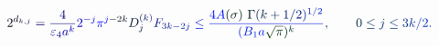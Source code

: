 \documentclass[12pt]{article}
\begin{document}
\makeatletter
\renewcommand*{\@textcolor}[3]{%
  \protect\leavevmode
  \begingroup
    \color#1{#2}#3%
  \endgroup
}
\makeatother
\begin{displaymath}
\mathcolor[RGB]{0,0,15}{2} ^ { \mathcolor[RGB]{0,0,30}{d} _ { \mathcolor[RGB]{0,0,45}{k} \mathcolor[RGB]{0,0,60}{,} \mathcolor[RGB]{0,0,75}{j} } } \mathcolor[RGB]{0,0,90}{=} \mathcolor[RGB]{0,0,105}{\frac { \mathcolor[RGB]{0,0,120}{4} } { \mathcolor[RGB]{0,0,135}{\varepsilon} _ { \mathcolor[RGB]{0,0,150}{4} } \mathcolor[RGB]{0,0,165}{a} ^ { \mathcolor[RGB]{0,0,180}{k} } } } \mathcolor[RGB]{0,0,195}{2} ^ { \mathcolor[RGB]{0,0,210}{-} \mathcolor[RGB]{0,0,225}{j} } \mathcolor[RGB]{0,0,240}{\pi} ^ { \mathcolor[RGB]{0,0,255}{j} \mathcolor[RGB]{0,15,0}{-} \mathcolor[RGB]{0,15,15}{2} \mathcolor[RGB]{0,15,30}{k} } \mathcolor[RGB]{0,15,45}{D} _ { \mathcolor[RGB]{0,15,60}{j} } ^ { \mathcolor[RGB]{0,15,75}{(} \mathcolor[RGB]{0,15,90}{k} \mathcolor[RGB]{0,15,105}{)} } \mathcolor[RGB]{0,15,120}{F} _ { \mathcolor[RGB]{0,15,135}{3} \mathcolor[RGB]{0,15,150}{k} \mathcolor[RGB]{0,15,165}{-} \mathcolor[RGB]{0,15,180}{2} \mathcolor[RGB]{0,15,195}{j} } \mathcolor[RGB]{0,15,210}{\leq} \mathcolor[RGB]{0,15,225}{\frac { \mathcolor[RGB]{0,15,240}{4} \mathcolor[RGB]{0,15,255}{A} \mathcolor[RGB]{0,30,0}{(} \mathcolor[RGB]{0,30,15}{\sigma} \mathcolor[RGB]{0,30,30}{)} \ \mathcolor[RGB]{0,30,45}{\Gamma} \mathcolor[RGB]{0,30,60}{(} \mathcolor[RGB]{0,30,75}{k} \mathcolor[RGB]{0,30,90}{+} \mathcolor[RGB]{0,30,105}{1} \mathcolor[RGB]{0,30,120}{/} \mathcolor[RGB]{0,30,135}{2} \mathcolor[RGB]{0,30,150}{)} ^ { \mathcolor[RGB]{0,30,165}{1} \mathcolor[RGB]{0,30,180}{/} \mathcolor[RGB]{0,30,195}{2} } } { \mathcolor[RGB]{0,30,210}{(} \mathcolor[RGB]{0,30,225}{B} _ { \mathcolor[RGB]{0,30,240}{1} } \mathcolor[RGB]{0,30,255}{a} \mathcolor[RGB]{0,45,0}{\sqrt { \mathcolor[RGB]{0,45,15}{\pi} } } \mathcolor[RGB]{0,45,30}{)} ^ { \mathcolor[RGB]{0,45,45}{k} } } } \mathcolor[RGB]{0,45,60}{,} \qquad \mathcolor[RGB]{0,45,75}{0} \mathcolor[RGB]{0,45,90}{\leq} \mathcolor[RGB]{0,45,105}{j} \mathcolor[RGB]{0,45,120}{\leq} \mathcolor[RGB]{0,45,135}{3} \mathcolor[RGB]{0,45,150}{k} \mathcolor[RGB]{0,45,165}{/} \mathcolor[RGB]{0,45,180}{2} \mathcolor[RGB]{0,45,195}{.}
\end{displaymath}
\end{document}
